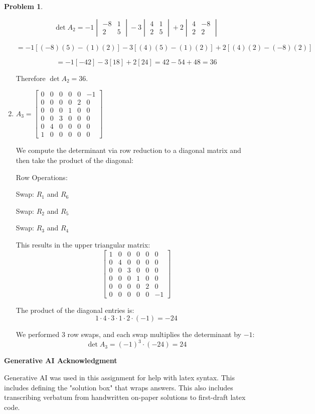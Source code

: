 \documentclass[12pt, oneside]{amsart}
\theoremstyle{definition}
\newtheorem{prob}{Problem}
\begin{document}
\begin{prob}
\begin{enumerate}
\begin{solution}
    \[
    \det A_2 = -1 \begin{vmatrix} -8 & 1 \\ 2 & 5 \end{vmatrix} - 3 \begin{vmatrix} 4 & 1 \\ 2 & 5 \end{vmatrix} + 2 \begin{vmatrix} 4 & -8 \\ 2 & 2 \end{vmatrix}
    \]
    
    \[
    = -1[(-8)(5) - (1)(2)] - 3[(4)(5) - (1)(2)] + 2[(4)(2) - (-8)(2)]
    \]
    
    \[
    = -1[-42] - 3[18] + 2[24] = 42 - 54 + 48 = 36
    \]
    
    Therefore $\det A_2 = 36$.
    \end{solution}

    \item $A_3= \left[\begin{matrix}
        0 & 0 & 0 & 0 & 0 & -1 \\
        0 & 0 & 0 & 0 & 2 & 0 \\ 
        0 & 0 & 0 & 1 & 0 & 0 \\
        0 & 0 & 3 & 0 & 0 & 0 \\
        0 & 4 & 0 & 0 & 0 & 0 \\
        1 & 0 & 0 & 0 & 0 & 0 
    \end{matrix}\right]$
    
    \begin{solution}
    We compute the determinant via row reduction to a diagonal matrix and then take the product of the diagonal:
    
    Row Operations:
    
    Swap: $R_1$ and $R_6$

    Swap: $R_2$ and $R_5$

    Swap: $R_3$ and $R_4$

    This results in the upper triangular matrix:
    \[
    \begin{bmatrix}
    1 & 0 & 0 & 0 & 0 & 0 \\
    0 & 4 & 0 & 0 & 0 & 0 \\
    0 & 0 & 3 & 0 & 0 & 0 \\
    0 & 0 & 0 & 1 & 0 & 0 \\
    0 & 0 & 0 & 0 & 2 & 0 \\
    0 & 0 & 0 & 0 & 0 & -1
    \end{bmatrix}
    \]
    
    The product of the diagonal entries is:
    \[
    1 \cdot 4 \cdot 3 \cdot 1 \cdot 2 \cdot (-1) = -24
    \]
    
    We performed 3 row swaps, and each swap multiplies the determinant by $-1$:
    \[
    \det A_3 = (-1)^3 \cdot (-24) = 24
    \]
    \end{solution}
\end{enumerate}
\end{prob}
\noindent \textbf{Generative AI Acknowledgment}

\noindent Generative AI was used in this assignment for help with latex syntax. This includes defining the "solution box" that wraps answers. This also includes transcribing verbatum from handwritten on-paper solutions to first-draft latex code.
\end{document}
